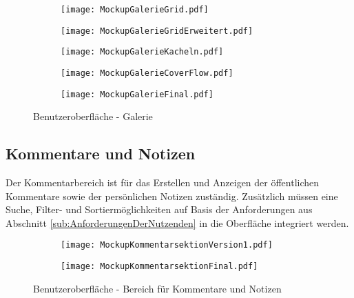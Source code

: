 \begin{figure}[h!]
\begin{subfigure}[c]{0.5\textwidth}
\texttt{[image: MockupGalerieGrid.pdf]}
\label{fig:MockupGalerieGrid}
\end{subfigure}%
\begin{subfigure}[c]{0.5\textwidth}
\texttt{[image: MockupGalerieGridErweitert.pdf]}
\label{fig:MockupGalerieGridErweitert}
\end{subfigure}
\par\bigskip
\begin{subfigure}[c]{0.5\textwidth}
\texttt{[image: MockupGalerieKacheln.pdf]}
\label{fig:MockupGalerieKacheln}
\end{subfigure}%
\begin{subfigure}[c]{0.5\textwidth}
\texttt{[image: MockupGalerieCoverFlow.pdf]}
\label{fig:MockupGalerieCoverFlow}
\end{subfigure}
\par\bigskip
\begin{subfigure}[c]{\textwidth}
\texttt{[image: MockupGalerieFinal.pdf]}
\label{fig:MockupGalerieFinal}
\end{subfigure}
\caption{Benutzeroberfläche - Galerie}
\label{fig:MockupGalerie}
\end{figure}

\subsection{Kommentare und Notizen}
Der Kommentarbereich ist für das Erstellen und Anzeigen der öffentlichen Kommentare sowie der persönlichen Notizen zuständig. Zusätzlich müssen eine Suche, Filter- und Sortiermöglichkeiten auf Basis der Anforderungen aus Abschnitt \ref{sub:AnforderungenDerNutzenden} in die Oberfläche integriert werden.

\begin{figure}[h!]
\begin{subfigure}[c]{\textwidth}
\texttt{[image: MockupKommentarsektionVersion1.pdf]}
\label{fig:MockupKommentarsektionVersion1}
\end{subfigure}
\par\bigskip
\begin{subfigure}[c]{\textwidth}
\texttt{[image: MockupKommentarsektionFinal.pdf]}
\label{fig:MockupKommentarsektionFinal}
\end{subfigure}
\caption{Benutzeroberfläche - Bereich für Kommentare und Notizen}
\label{fig:MockupKommentarsektion}
\end{figure}

